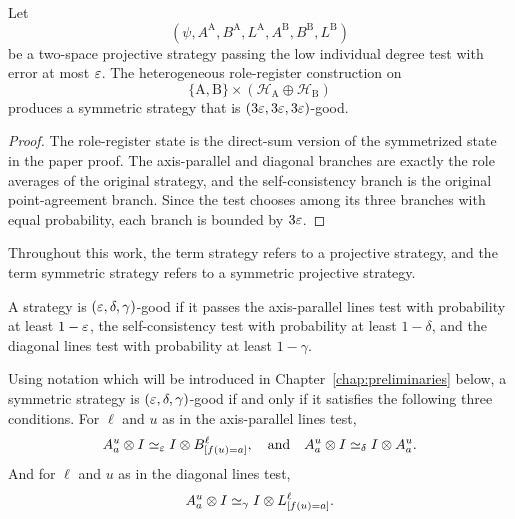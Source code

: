 \begin{lemma}\label{lem:heterogeneous-role-register-symmetrization}
	\leanok
	Let
	\[
		(\psi,A^{\mathrm A},B^{\mathrm A},L^{\mathrm A},
		A^{\mathrm B},B^{\mathrm B},L^{\mathrm B})
	\]
	be a two-space projective strategy passing the low individual degree test
	with error at most \(\varepsilon\).  The heterogeneous role-register construction
	on
	\[
		\{\mathrm A,\mathrm B\}\times
		(\mathcal H_{\mathrm A}\oplus\mathcal H_{\mathrm B})
	\]
	produces a symmetric strategy that is
	\((3\varepsilon,3\varepsilon,3\varepsilon)\)-good.
\end{lemma}
\begin{proof}
	\leanok
	The role-register state is the direct-sum version of the symmetrized state in
	the paper proof.  The axis-parallel and diagonal branches are exactly the
	role averages of the original strategy, and the self-consistency branch is
	the original point-agreement branch.  Since the test chooses among its three
	branches with equal probability, each branch is bounded by \(3\varepsilon\).
\end{proof}

\begin{remark}\label{rem:strategy-convention}
	Throughout this work, the term strategy refers to a projective strategy, and the term symmetric strategy refers to a symmetric projective strategy.
\end{remark}

\begin{definition}\label{def:good-strategy}
	\leanok
	A strategy is $(\varepsilon,\delta,\gamma)$-good if it passes the axis-parallel lines test with probability at least $1-\varepsilon$, the self-consistency test with probability at least $1-\delta$, and the diagonal lines test with probability at least $1-\gamma$.
\end{definition}

\begin{remark}\label{rem:good-strat-characterization}
	Using notation which will be introduced in Chapter~\ref{chap:preliminaries} below, a symmetric strategy is $(\varepsilon,\delta,\gamma)$-good if and only if it satisfies the following three conditions. For $\ell$ and $u$ as in the axis-parallel lines test,
	\[
		A_a^u \otimes I \simeq_\varepsilon I \otimes B^\ell_{[f(u)=a]},
		\quad
		\text{and}
		\quad
		A_a^u \otimes I \simeq_\delta I \otimes A_a^u.
	\]
	And for $\ell$ and $u$ as in the diagonal lines test,
	\[
		A_a^u \otimes I \simeq_\gamma I \otimes L^\ell_{[f(u)=a]}.
	\]
\end{remark}


